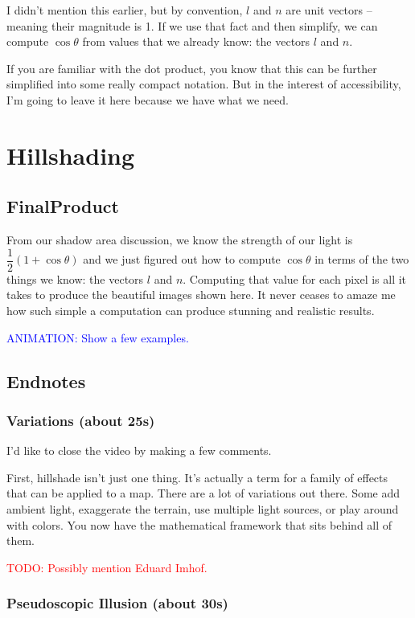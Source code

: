 \documentclass{article}
\newcommand\todo[1]{\textcolor{red}{TODO: #1}}
\newcommand\animation[1]{\textcolor{blue}{ANIMATION: #1}}
\begin{document}
I didn't mention this earlier, but by convention, $l$ and $n$ are unit vectors -- meaning their magnitude is 1.
If we use that fact and then simplify, we can compute $\cos \theta$ from values that we already know: the vectors $l$ and $n$.

If you are familiar with the dot product, you know that this can be further simplified into some really compact notation.
But in the interest of accessibility, I'm going to leave it here because we have what we need.

\section{Hillshading}

\subsection{FinalProduct}

From our shadow area discussion, we know the strength of our light is $\dfrac{1}{2}(1 + \cos \theta)$ and we just figured out how to compute $\cos \theta$ in terms of the two things we know: the vectors $l$ and $n$.
Computing that value for each pixel is all it takes to produce the beautiful images shown here.
It never ceases to amaze me how such simple a computation can produce stunning and realistic results.

\animation{Show a few examples.}

\subsection{Endnotes}

\subsubsection{Variations (about 25s)}

I'd like to close the video by making a few comments.

First, hillshade isn't just one thing.
It's actually a term for a family of effects that can be applied to a map.
There are a lot of variations out there.
Some add ambient light, exaggerate the terrain, use multiple light sources, or play around with colors.
You now have the mathematical framework that sits behind all of them.

\todo{Possibly mention Eduard Imhof.}

\subsubsection{Pseudoscopic Illusion (about 30s)}
\end{document}
